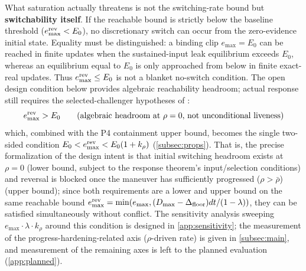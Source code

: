 What saturation actually threatens is not the switching-rate bound but \textbf{switchability itself}. If the reachable bound is strictly below the baseline threshold ($e^{\text{rev}}_{\max}<E_0$), no discretionary switch can occur from the zero-evidence initial state. Equality must be distinguished: a binding clip $e_{\max}=E_0$ can be reached in finite updates when the sustained-input leak equilibrium exceeds $E_0$, whereas an equilibrium equal to $E_0$ is only approached from below in finite exact-real updates. Thus $e^{\text{rev}}_{\max}\le E_0$ is not a blanket no-switch condition. The open design condition below provides algebraic reachability headroom; actual response still requires the selected-challenger hypotheses of :
\begin{equation}\label{eq:headroom}
e^{\text{rev}}_{\max} > E_0 \qquad \text{(algebraic headroom at } \rho=0\text{, not unconditional liveness)}
\end{equation}
which, combined with the P4 containment upper bound, becomes the single two-sided condition $E_0 < e^{\text{rev}}_{\max} < E_0(1+k_\rho)$ (\cref{subsec:props}). That is, the precise formalization of the design intent is that initial switching headroom exists at $\rho = 0$ (lower bound, subject to the response theorem's input/selection conditions) and reversal is blocked once the maneuver has sufficiently progressed ($\rho > \bar\rho$) (upper bound); since both requirements are a lower and upper bound on the same reachable bound $e^{\text{rev}}_{\max} = \min(e_{\max}, (D_{\max}-\Delta_{\text{floor}})dt/(1-\lambda))$, they can be satisfied simultaneously without conflict. The sensitivity analysis sweeping $e_{\max}\cdot\lambda\cdot k_\rho$ around this condition is designed in \cref{app:sensitivity}; the measurement of the progress-hardening-related axis ($\rho$-driven rate) is given in \cref{subsec:main}, and measurement of the remaining axes is left to the planned evaluation (\cref{app:planned}).

